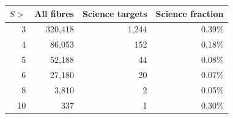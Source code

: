 \begin{ruledtabular}
\begin{tabular}{r r r r}
$S>$ & All fibres & Science targets & Science fraction \\
\hline
3 & 320{,}418 & 1{,}244 & 0.39\% \\
4 & 86{,}053 & 152 & 0.18\% \\
5 & 52{,}188 & 44 & 0.08\% \\
6 & 27{,}180 & 20 & 0.07\% \\
8 & 3{,}810 & 2 & 0.05\% \\
10 & 337 & 1 & 0.30\% \\
\end{tabular}
\end{ruledtabular}
